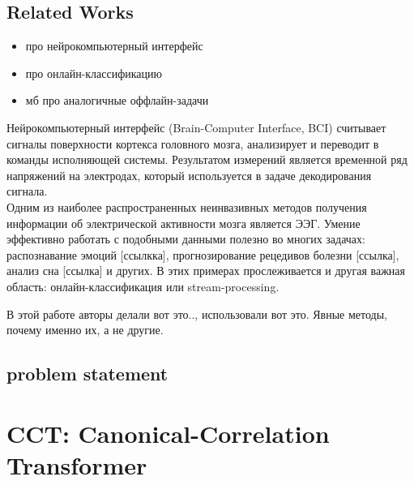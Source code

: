 \documentclass[a4paper,14pt]{article}
\theoremstyle{plain} %
\theoremstyle{definition} %
\theoremstyle{remark} %
\begin{document}
        \subsection{Related Works}
        \begin{itemize}
            \item про нейрокомпьютерный интерфейс
            \item про онлайн-классификацию
            \item мб про аналогичные оффлайн-задачи
        \end{itemize}
        Нейрокомпьютерный интерфейс (Brain-Computer Interface, BCI) \cite{shih2012brain} считывает сигналы поверхности кортекса головного мозга, анализирует и переводит в команды исполняющей системы. Результатом измерений является временной ряд напряжений на электродах, который используется в задаче декодирования сигнала. \\
        Одним из наиболее распространенных неинвазивных методов получения информации об электрической активности мозга является ЭЭГ. Умение эффективно работать с подобными данными полезно во многих задачах: распознавание эмоций [ссылкка], прогнозирование рецедивов болезни [ссылка], анализ сна [ссылка] и других.
        В этих примерах прослеживается и другая важная область: онлайн-классификация или stream-processing. 

        В этой работе авторы делали вот это.., использовали вот это. Явные методы, почему именно их, а не другие.

        \subsection{problem statement}
    
        \section{CCT: Canonical-Correlation Transformer}
\end{document}
